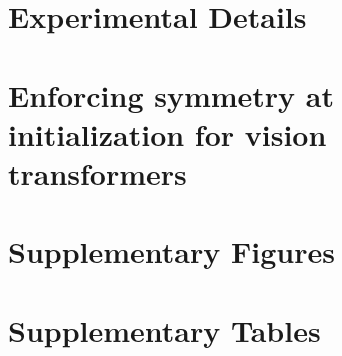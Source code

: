 \documentclass{article}
\theoremstyle{plain}
\theoremstyle{definition}
\theoremstyle{remark}
\begin{document}
%

\section{Experimental Details}
\label{sec-experimental-details}


\section{Enforcing symmetry at initialization for vision transformers}
\label{sec-experimental-results-vit}


\section{Supplementary Figures}
\label{sec-supp-figures}


\section{Supplementary Tables}
\label{sec-supp-tables}



\end{document}
